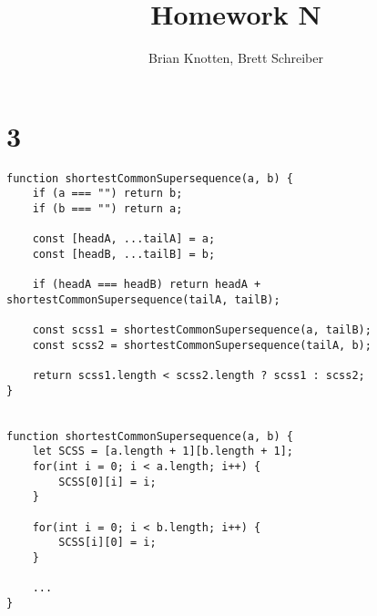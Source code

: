 \documentclass[letterpaper,notitlepage,twoside]{article}
\begin{document}
\title{Homework N}
\author{Brian Knotten, Brett Schreiber}
\maketitle

\section*{3}
\begin{verbatim}
function shortestCommonSupersequence(a, b) {
	if (a === "") return b;
	if (b === "") return a;
	
	const [headA, ...tailA] = a;
	const [headB, ...tailB] = b;
	
	if (headA === headB) return headA + shortestCommonSupersequence(tailA, tailB);
	
	const scss1 = shortestCommonSupersequence(a, tailB);
	const scss2 = shortestCommonSupersequence(tailA, b);
	
	return scss1.length < scss2.length ? scss1 : scss2;
}


function shortestCommonSupersequence(a, b) {
	let SCSS = [a.length + 1][b.length + 1];
	for(int i = 0; i < a.length; i++) {
		SCSS[0][i] = i;
	}
	
	for(int i = 0; i < b.length; i++) {
		SCSS[i][0] = i;
	}
  
	...
}
\end{verbatim}
\end{document}
